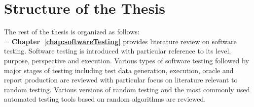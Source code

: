 
%



\section{Structure of the Thesis}
The rest of the thesis is organized as follows:\\

\hangindent=\parindent
{}
\noindent
\textbf{Chapter~\ref{chap:softwareTesting}} provides literature review on software testing. Software testing is introduced with particular reference to its level, purpose, perspective and execution. Various types of software testing followed by major stages of testing including test data generation, execution, oracle and report production are reviewed with particular focus on literature relevant to random testing. Various versions of random testing and the most commonly used automated testing tools based on random algorithms are reviewed. \\


